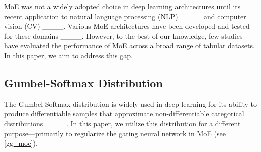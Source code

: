 MoE was not a widely adopted choice in deep learning architectures until its recent application to natural language processing (NLP) ____ and computer vision (CV) ____. Various MoE architectures have been developed and tested for these domains ____. However, to the best of our knowledge, few studies have evaluated the performance of MoE across a broad range of tabular datasets. In this paper, we aim to address this gap.

\subsection{Gumbel-Softmax Distribution}
The Gumbel-Softmax distribution is widely used in deep learning for its ability to produce differentiable samples that approximate non-differentiable categorical distributions ____. In this paper, we utilize this distribution for a different purpose—primarily to regularize the gating neural network in MoE (see \cref{gg_moe}).